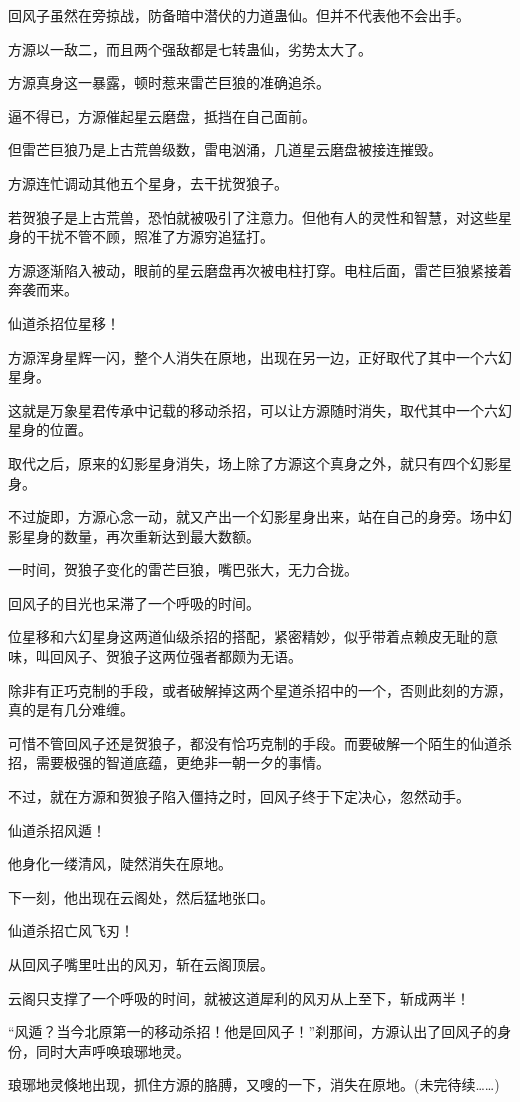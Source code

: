 \begin{this_body}
回风子虽然在旁掠战，防备暗中潜伏的力道蛊仙。但并不代表他不会出手。

方源以一敌二，而且两个强敌都是七转蛊仙，劣势太大了。

方源真身这一暴露，顿时惹来雷芒巨狼的准确追杀。

逼不得已，方源催起星云磨盘，抵挡在自己面前。

但雷芒巨狼乃是上古荒兽级数，雷电汹涌，几道星云磨盘被接连摧毁。

方源连忙调动其他五个星身，去干扰贺狼子。

若贺狼子是上古荒兽，恐怕就被吸引了注意力。但他有人的灵性和智慧，对这些星身的干扰不管不顾，照准了方源穷追猛打。

方源逐渐陷入被动，眼前的星云磨盘再次被电柱打穿。电柱后面，雷芒巨狼紧接着奔袭而来。

仙道杀招位星移！

方源浑身星辉一闪，整个人消失在原地，出现在另一边，正好取代了其中一个六幻星身。

这就是万象星君传承中记载的移动杀招，可以让方源随时消失，取代其中一个六幻星身的位置。

取代之后，原来的幻影星身消失，场上除了方源这个真身之外，就只有四个幻影星身。

不过旋即，方源心念一动，就又产出一个幻影星身出来，站在自己的身旁。场中幻影星身的数量，再次重新达到最大数额。

一时间，贺狼子变化的雷芒巨狼，嘴巴张大，无力合拢。

回风子的目光也呆滞了一个呼吸的时间。

位星移和六幻星身这两道仙级杀招的搭配，紧密精妙，似乎带着点赖皮无耻的意味，叫回风子、贺狼子这两位强者都颇为无语。

除非有正巧克制的手段，或者破解掉这两个星道杀招中的一个，否则此刻的方源，真的是有几分难缠。

可惜不管回风子还是贺狼子，都没有恰巧克制的手段。而要破解一个陌生的仙道杀招，需要极强的智道底蕴，更绝非一朝一夕的事情。

不过，就在方源和贺狼子陷入僵持之时，回风子终于下定决心，忽然动手。

仙道杀招风遁！

他身化一缕清风，陡然消失在原地。

下一刻，他出现在云阁处，然后猛地张口。

仙道杀招亡风飞刃！

从回风子嘴里吐出的风刃，斩在云阁顶层。

云阁只支撑了一个呼吸的时间，就被这道犀利的风刃从上至下，斩成两半！

“风遁？当今北原第一的移动杀招！他是回风子！”刹那间，方源认出了回风子的身份，同时大声呼唤琅琊地灵。

琅琊地灵倏地出现，抓住方源的胳膊，又嗖的一下，消失在原地。(未完待续……)

\end{this_body}

